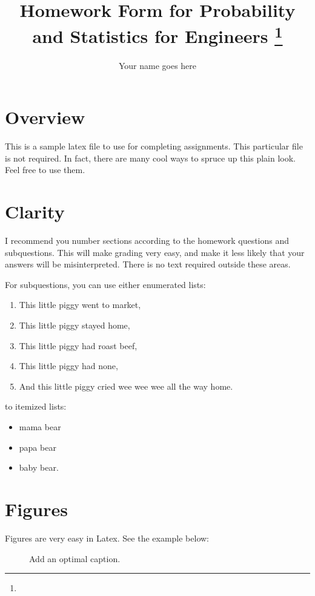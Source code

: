 \documentclass[11pt]{article}
\title{Homework Form for Probability and Statistics for Engineers
\footnote{\s{CS 3130 / ECE 3530 ProbStats; \;\; Fall 2014 \hfill
Instructor: Jeff M. Phillips, University of Utah}
}
}
\author{Your name goes here}
\begin{document}
\maketitle





\section{Overview}

This is a sample latex file to use for completing assignments.  This particular file is not required.  In fact, there are many cool ways to spruce up this plain look.  Feel free to use them.  

\section{Clarity}
I recommend you number sections according to the homework questions and subquestions.  This will make grading very easy, and make it less likely that your answers will be misinterpreted.  There is no text required outside these areas.  

For subquestions, you can use either enumerated lists:
\begin{enumerate}
\item This little piggy went to market,
\item This little piggy stayed home,
\item This little piggy had roast beef,
\item This little piggy had none,
\item And this little piggy cried wee wee wee all the way home.
\end{enumerate}
to itemized lists:
\begin{itemize}
\item mama bear
\item papa bear
\item baby bear.  
\end{itemize}


\section{Figures}
Figures are very easy in Latex.  See the example below:

\begin{figure}[h]
\caption{Add an optimal caption.}
\label{fig:name}
\end{figure}
\end{document}
